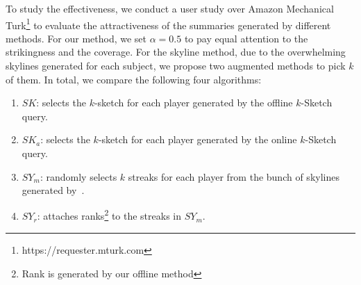 %

To study the effectiveness, we conduct a user study over Amazon Mechanical Turk\footnote{https://requester.mturk.com} to evaluate the attractiveness of the summaries generated by different methods. For our method, we set $\alpha=0.5$ to pay equal attention to the strikingness and the coverage. For the skyline method, due to the overwhelming skylines generated for each subject, 
we propose two augmented methods to pick $k$ of them. In total, we compare the following four algorithms:
\begin{enumerate}
\item{$SK$: selects the $k$-sketch for each player generated by the offline $k$-Sketch query.}
\item{$SK_a$: selects the $k$-sketch for each player generated by the online $k$-Sketch query.}
\item{$SY_m$: randomly selects $k$ streaks for each player from the bunch of skylines generated by~\cite{zhang2014discovering}.}
\item{$SY_r$: attaches ranks\footnote{Rank is generated by our offline method} to the streaks in $SY_m$.}
\end{enumerate}

